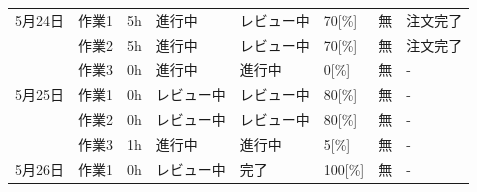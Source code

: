 \documentclass[a4j,11pt,dvipdfmx]{jsarticle}
\begin{document}
\begin{table}[H]
\begin{tabular}{p{5em} | p{4em} p{4em} p{6em} p{6em} p{3em} p{4em} p{5em}}
\hline

5月24日 & %
作業1 & %
5h & %
進行中 & %
レビュー中 & %
70[\%] & %
無 & %
注文完了 %
\\

 & %
作業2 & %
5h & %
進行中 & %
レビュー中 & %
70[\%] & %
無 & %
注文完了 %
\\

 & %
作業3 & %
0h & %
進行中 & %
進行中 & %
0[\%] & %
無 & %
- %
\\

\hline

5月25日 & %
作業1 & %
0h & %
レビュー中 & %
レビュー中 & %
80[\%] & %
無 & %
- %
\\

 & %
作業2 & %
0h& %
レビュー中 & %
レビュー中 & %
80[\%] & %
無 & %
- %
\\

 & %
作業3 & %
1h & %
進行中 & %
進行中 & %
5[\%] & %
無 & %
- %
\\

\hline

5月26日 & %
作業1 & %
0h & %
レビュー中 & %
完了 & %
100[\%] & %
無 & %
- %
\\


\end{tabular}
\end{table}
\end{document}
